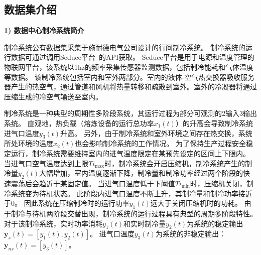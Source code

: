 \subsection{数据集介绍}
\textbf{1) 数据中心制冷系统简介}

\label{sec:ecotype_description}
制冷系统公有数据集采集于施耐德电气公司设计的行间制冷系统\cite{WANG2022111790}。
制冷系统的运行数据可通过调用Seduce平台~\cite{SeducePastor2018}的API获取。
Seduce平台是用于电源和温度管理的物联网平台，该系统以1hz的频率采集传感器监测数据，包括制冷能耗和气体温度等数据。
该制冷系统包括室内和室外两部分。室内的液体-空气热交换器吸收服务器产生的热空气，通过管道和风机将热量转移和疏散到室外。室外的冷凝器将通过压缩生成的冷空气输送至室内。

制冷系统是一种典型的周期性多阶段系统，其运行过程为部分可观测的2输入3输出系统。
直观地，热负载（熔炼设备的运行总功率$x_1(t)$）的升高会导致制冷系统进气口温度$y_3(t)$升高。
另外，由于制冷系统和室外环境之间存在热交换，系统所处环境的温度$x_2(t)$也会影响制冷系统的工作情况。
为了保持生产过程安全稳定运行，制冷系统需要维持室内的进气温度限定在某预先设定的区间上下限内。
当进气口空气温度达到上限$Ti_{\max}$时，制冷系统会开启压缩机，制冷系统产生的制冷量$y_2(t)$大幅增加，室内温度逐渐下降，制冷量和制冷功率经过两个阶段的快速震荡后会趋近于某固定值。
当进气口温度低于下阈值$Ti_{\min}$时，压缩机关闭，制冷系统变为待机状态。
此阶段内进气口温度不断上升，其制冷量和制冷功率接近于0。
因此系统在压缩制冷时的运行功率$y_1(t)$远大于关闭压缩机时的功耗。
由于制冷与待机两阶段交替出现，制冷系统的运行过程具有典型的周期多阶段特性。
对于该制冷系统，实时功率消耗$y_1(t)$和实时制冷量$y_2(t)$为系统的稳定输出$\boldsymbol y_s(t)=[y_1(t), y_2(t)]$。
进气口温度$y_3(t)$为系统的非稳定输出：$\boldsymbol y_{ns}(t)=[y_3(t)]$。

